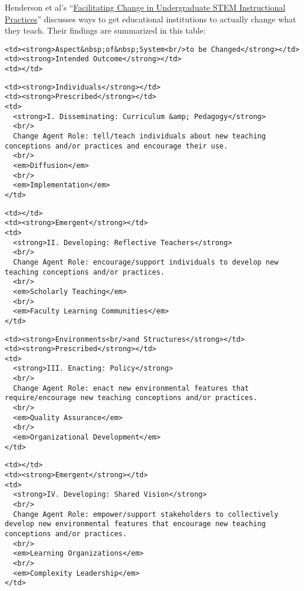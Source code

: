 Henderson et al's
``\href{\{\{\%20page.root\%20\}\}/files/papers/henderson-facilitating-stem-teaching-change-2011.pdf}{Facilitating
Change in Undergraduate STEM Instructional Practices}'' discusses ways
to get educational institutions to actually change what they teach.
Their findings are summarized in this table:

\begin{verbatim}
<td><strong>Aspect&nbsp;of&nbsp;System<br/>to be Changed</strong></td>
<td><strong>Intended Outcome</strong></td>
<td></td>
\end{verbatim}

\begin{verbatim}
<td><strong>Individuals</strong></td>
<td><strong>Prescribed</strong></td>
<td>
  <strong>I. Disseminating: Curriculum &amp; Pedagogy</strong>
  <br/>
  Change Agent Role: tell/teach individuals about new teaching conceptions and/or practices and encourage their use.
  <br/>
  <em>Diffusion</em>
  <br/>
  <em>Implementation</em>
</td>
\end{verbatim}

\begin{verbatim}
<td></td>
<td><strong>Emergent</strong></td>
<td>
  <strong>II. Developing: Reflective Teachers</strong>
  <br/>
  Change Agent Role: encourage/support individuals to develop new teaching conceptions and/or practices.
  <br/>
  <em>Scholarly Teaching</em>
  <br/>
  <em>Faculty Learning Communities</em>
</td>
\end{verbatim}

\begin{verbatim}
<td><strong>Environments<br/>and Structures</strong></td>
<td><strong>Prescribed</strong></td>
<td>
  <strong>III. Enacting: Policy</strong>
  <br/>
  Change Agent Role: enact new environmental features that require/encourage new teaching conceptions and/or practices.
  <br/>
  <em>Quality Assurance</em>
  <br/>
  <em>Organizational Development</em>
</td>
\end{verbatim}

\begin{verbatim}
<td></td>
<td><strong>Emergent</strong></td>
<td>
  <strong>IV. Developing: Shared Vision</strong>
  <br/>
  Change Agent Role: empower/support stakeholders to collectively develop new environmental features that encourage new teaching conceptions and/or practices.
  <br/>
  <em>Learning Organizations</em>
  <br/>
  <em>Complexity Leadership</em>
</td>
\end{verbatim}


